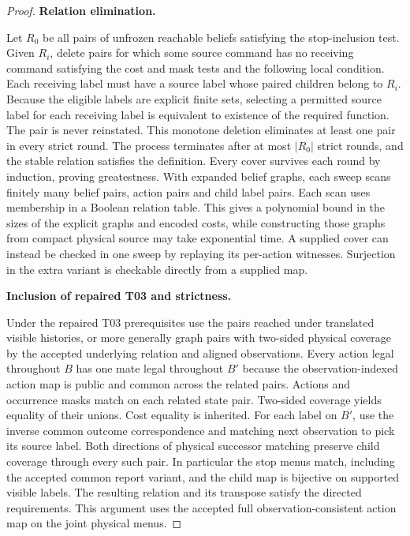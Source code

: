 \begin{proof}
\textbf{Relation elimination.}

Let \(R_0\) be all pairs of unfrozen reachable beliefs satisfying the stop-inclusion test. Given \(R_i\), delete pairs for which some source command has no receiving command satisfying the cost and mask tests and the following local condition. Each receiving label must have a source label whose paired children belong to \(R_i\). Because the eligible labels are explicit finite sets, selecting a permitted source label for each receiving label is equivalent to existence of the required function. The pair is never reinstated. This monotone deletion eliminates at least one pair in every strict round. The process terminates after at most \(|R_0|\) strict rounds, and the stable relation satisfies the definition. Every cover survives each round by induction, proving greatestness. With expanded belief graphs, each sweep scans finitely many belief pairs, action pairs and child label pairs. Each scan uses membership in a Boolean relation table. This gives a polynomial bound in the sizes of the explicit graphs and encoded costs, while constructing those graphs from compact physical source may take exponential time. A supplied cover can instead be checked in one sweep by replaying its per-action witnesses. Surjection in the extra variant is checkable directly from a supplied map.

\textbf{Inclusion of repaired T03 and strictness.}

Under the repaired T03 prerequisites use the pairs reached under translated visible histories, or more generally graph pairs with two-sided physical coverage by the accepted underlying relation and aligned observations. Every action legal throughout \(B\) has one mate legal throughout \(B'\) because the observation-indexed action map is public and common across the related pairs. Actions and occurrence masks match on each related state pair. Two-sided coverage yields equality of their unions. Cost equality is inherited. For each label on \(B'\), use the inverse common outcome correspondence and matching next observation to pick its source label. Both directions of physical successor matching preserve child coverage through every such pair. In particular the stop menus match, including the accepted common report variant, and the child map is bijective on supported visible labels. The resulting relation and its transpose satisfy the directed requirements. This argument uses the accepted full observation-consistent action map on the joint physical menus.


\end{proof}
